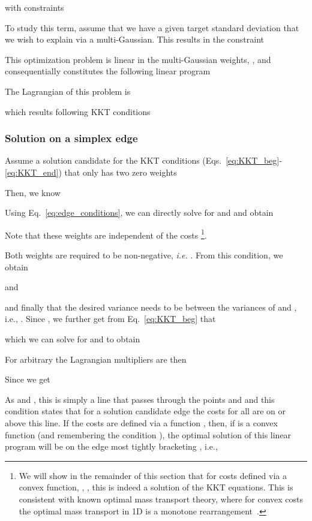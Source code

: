 \documentclass{article}
\numberwithin{equation}{section}
\newcommand{\ie}{{i.e.}}
\begin{document}
with constraints

To study this term, assume that we have a given target standard deviation  that we wish to explain via a multi-Gaussian. This results in the constraint

This optimization problem is linear in the multi-Gaussian weights, , and consequentially constitutes the following linear program

The Lagrangian of this problem is

which results following KKT conditions~\cite{nocedal2006numerical}


\subsubsection{Solution on a simplex edge}

Assume a solution candidate for the KKT conditions (Eqs.~\eqref{eq:KKT_beg}-\eqref{eq:KKT_end}) that only has two zero weights

Then, we know

Using Eq.~\eqref{eq:edge_conditions}, we can directly solve for  and  and obtain

Note that these weights are independent of the costs \footnote{We will show in the remainder of this section that for costs defined via a convex function, , , this is indeed a solution of the KKT equations. This is consistent with known optimal mass transport theory, where for convex costs the optimal mass transport in 1D is a monotone rearrangement~\cite{delon2012}.}. 

Both weights are required to be non-negative, \emph{i.e.}  . From this condition, we obtain

and

and finally that the desired variance needs to be between the variances of  and , \ie, . Since , we further get from Eq.~\eqref{eq:KKT_beg} that

which we can solve for  and  to obtain

For arbitrary  the Lagrangian multipliers are then

Since  we get

As  and , this is simply a line that passes through the points  and  and this condition states that for a solution candidate edge  the costs for all  are on or above this line. If the costs are defined via a function , then, if  is a convex function (and remembering the condition ), the optimal solution of this linear program will be on the edge  most tightly bracketing , \ie,
\end{document}
